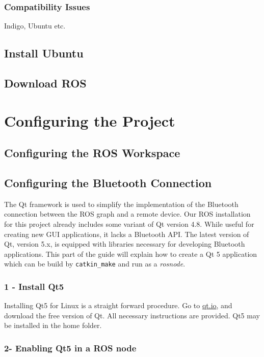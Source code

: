 \subsubsection{Compatibility Issues}

Indigo, Ubuntu etc.

\subsection{Install Ubuntu}

\subsection{Download ROS}

\section{Configuring the Project}

\subsection{Configuring the ROS Workspace}

\subsection{Configuring the Bluetooth Connection}

The Qt framework is used to simplify the implementation of the Bluetooth connection between the \ac{ROS} graph and a remote device. Our \ac{ROS} installation for this project already includes some variant of Qt version 4.8. While useful for creating new \ac{GUI} applications, it lacks a Bluetooth API. The latest version of Qt, version 5.x, is equipped with libraries necessary for developing Bluetooth applications. This part of the guide will explain how to create a Qt 5 application which can be build by \texttt{catkin\_make} and run as a \textit{rosnode}.

\subsubsection{1 - Install Qt5}

Installing Qt5 for Linux is a straight forward procedure. Go to \url{qt.io}, and download the free version of Qt. All necessary instructions are provided. Qt5 may be installed in the home folder.

\subsubsection{2- Enabling Qt5 in a ROS node}

